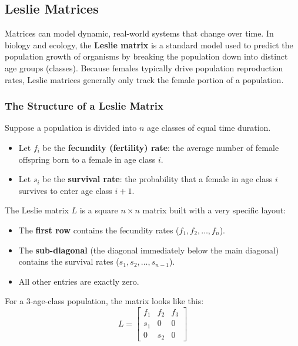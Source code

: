 
\subsection{Leslie Matrices}

Matrices can model dynamic, real-world systems that change over time. In biology and ecology, the \textbf{Leslie matrix} is a standard model used to predict the population growth of organisms by breaking the population down into distinct age groups (classes). Because females typically drive population reproduction rates, Leslie matrices generally only track the female portion of a population.

\subsubsection*{The Structure of a Leslie Matrix}

Suppose a population is divided into $n$ age classes of equal time duration. 
\begin{itemize}[leftmargin=*]
  \item Let $f_i$ be the \textbf{fecundity (fertility) rate}: the average number of female offspring born to a female in age class $i$.
  \item Let $s_i$ be the \textbf{survival rate}: the probability that a female in age class $i$ survives to enter age class $i+1$.
\end{itemize}

The Leslie matrix $L$ is a square $n \times n$ matrix built with a very specific layout:
\begin{itemize}[leftmargin=*]
  \item The \textbf{first row} contains the fecundity rates ($f_1, f_2, \dots, f_n$).
  \item The \textbf{sub-diagonal} (the diagonal immediately below the main diagonal) contains the survival rates ($s_1, s_2, \dots, s_{n-1}$).
  \item All other entries are exactly zero.
\end{itemize}

For a 3-age-class population, the matrix looks like this:
\[
L = \begin{bmatrix} 
f_1 & f_2 & f_3 \\ 
s_1 & 0 & 0 \\ 
0 & s_2 & 0 
\end{bmatrix}
\]

